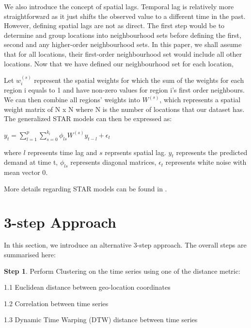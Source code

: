 \documentclass[nonblindrev,msom]{informs3} %
\begin{document}
\noindent We also introduce the concept of spatial lags. Temporal lag is relatively more straightforward as it just shifts the observed value to a different time in the past. However, defining spatial lags are not as direct. The first step would be to determine and group locations into neighbourhood sets before defining the first, second and any higher-order neighbourhood sets. In this paper, we shall assume that for all locations, their first-order neighbourhood set would include all other locations. Now that we have defined our neighbourhood set for each location, 

\noindent Let $w_{i}^{(s)}$ represent the spatial weights for which the sum of the weights for each region i equals to 1 and have non-zero values for region i's first order neighbours. We can then combine all regions' weights into $W^{(s)}$, which represents a spatial weight matrix of N x N where N is the number of locations that our dataset has. \\


\noindent The generalized STAR models can then be expressed as: 

\begin{center}
    $\displaystyle y_{t} = \sum_{l=1}^{p}\sum_{s=0}^{k_l}\phi_{ls} W^{(s)}y_{t-l} + \epsilon_{t}$
\end{center}

\noindent where $l$ represents time lag and $s$ reprsents spatial lag. $y_{t}$ represents the predicted demand at time t, $\phi_{ls}$ represents diagonal matrices, $\epsilon_{t}$ represents white noise with mean vector 0. 

\noindent More details regarding STAR models can be found in \cite{KURT20152537}.

\section{3-step Approach}

In this section, we introduce an alternative 3-step approach. The overall steps are summarised here:

\noindent \textbf{Step 1}. Perform Clustering on the time series using one of the distance metric: 

	1.1 Euclidean distance between geo-location coordinates
	
	1.2 Correlation between time series 
	
	1.3 Dynamic Time Warping (DTW) distance between time series \\
	
\end{document}
